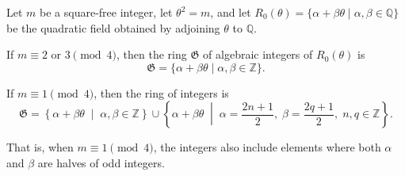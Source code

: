 Let $m$ be a square-free integer, let $\theta^2 = m$, and let $R_0(\theta) = \{\alpha + \beta\theta \mid \alpha, \beta \in \mathbb{Q}\}$ be the quadratic field obtained by adjoining $\theta$ to $\mathbb{Q}$.

If $m \equiv 2$ or $3 \pmod{4}$, then the ring $\mathfrak{G}$ of algebraic integers of $R_0(\theta)$ is
$$\mathfrak{G} = \{\alpha + \beta\theta \mid \alpha, \beta \in \mathbb{Z}\}.$$

If $m \equiv 1 \pmod{4}$, then the ring of integers is
$$\mathfrak{G} = \left\{\alpha + \beta\theta \;\middle|\; \alpha, \beta \in \mathbb{Z}\right\} \cup \left\{\alpha + \beta\theta \;\middle|\; \alpha = \frac{2n+1}{2},\; \beta = \frac{2q+1}{2},\; n,q \in \mathbb{Z}\right\}.$$

That is, when $m \equiv 1 \pmod{4}$, the integers also include elements where both $\alpha$ and $\beta$ are halves of odd integers.
